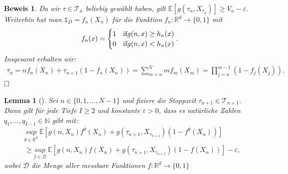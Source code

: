 \documentclass[12pt,titlepage,headsepline]{article}
\newtheorem*{lemma-non}{Lemma}
\newtheorem*{beweis-non}{Beweis}
\begin{document}
\begin{beweis-non}
{        Da wir $\tau \in \mathcal{T}_n$ beliebig gewählt haben, gilt $\mathbb{E}[g(\tau_n,X_{\tau_n})] \geq V_n - \varepsilon $. Weiterhin hat man $\mathds{1}_D = f_n(X_n)$ für die Funktion $f_n: \mathbb{R}^d \rightarrow \{0,1\}$ mit
        \begin{align*}
          f_n(x) =
          \begin{cases}
            1 & \textup{if} g(n,x) \geq h_n(x) \\
            0 & \textup{if} g(n,x) < h_n(x)
          \end{cases}.
        \end{align*}
        Insgesamt erhalten wir:
        \begin{align*}
          \tau_n = nf_n(X_n)+\tau_{n+1}(1-f_n(X_n)) = \sum_{m=n}^N mf_m(X_m) = \prod_{j=n}^{m-1}(1-f_j(X_j)).
        \end{align*}
        $\hfill\Box$
        }
      \end{beweis-non}


      \begin{lemma-non}[\cite{becker_deep_2019,Prop. 4}]
        \textup{
        Sei $n \in \{ 0,1,\ldots,N-1 \}$ und fixiere die Stoppzeit $\tau_{n+1} \in \mathcal{T}_{n+1}$. Dann gilt für jede Tiefe $I \geq 2$ und konstante $\varepsilon > 0$, dass es natürliche Zahlen $q_1,\ldots,q_{I-1} \in \mathbb{N}$ gibt mit:
        \begin{align*}
          & \underset{\theta \in \mathbb{R}^d}{sup} \ \mathbb{E}[g(n,X_n)f^{\theta}(X_n)+g(\tau_{n+1},X_{\tau_{n+1}})(1-f^{\theta}(X_n))] \\
          & \geq \underset{f \in \mathcal{D}}{sup} \ \mathbb{E}[g(n,X_n)f(X_n)+g(\tau_{n+1},X_{\tau_{n+1}})(1-f(X_n))] - \varepsilon,
        \end{align*}
        wobei $\mathcal{D}$ die Menge aller messbare Funktionen $f: \mathbb{R}^d \rightarrow \{0,1\}$
        }
      \end{lemma-non}
\end{document}
